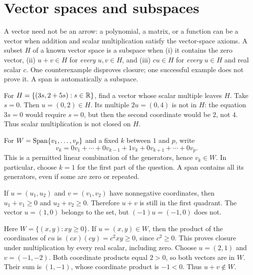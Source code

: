 \section{Vector spaces and subspaces}
A vector need not be an arrow: a polynomial, a matrix, or a function can be a
vector when addition and scalar multiplication satisfy the vector-space axioms.
A subset $H$ of a known vector space is a subspace when (i) it contains the zero
vector, (ii) $u+v\in H$ for \emph{every} $u,v\in H$, and (iii) $cu\in H$ for
\emph{every} $u\in H$ and real scalar $c$. One counterexample disproves closure;
one successful example does not prove it. A span is automatically a subspace.

\goal For $H=\{(3s,2+5s):s\in\mathbb{R}\}$, find a vector whose scalar multiple leaves $H$.
Take $s=0$. Then $u=(0,2)\in H$. Its multiple $2u=(0,4)$ is not in $H$:
the equation $3s=0$ would require $s=0$, but then the second coordinate would
be $2$, not $4$. Thus scalar multiplication is not closed on $H$.

For $W=\operatorname{Span}\{v_1,\ldots,v_p\}$ and a fixed $k$ between $1$ and $p$, write
\[
 v_k=0v_1+\cdots+0v_{k-1}+1v_k+0v_{k+1}+\cdots+0v_p.
\]
This is a permitted linear combination of the generators, hence $v_k\in W$.
In particular, choose $k=1$ for the first part of the question. A span contains
all its generators, even if some are zero or repeated.

If $u=(u_1,u_2)$ and $v=(v_1,v_2)$ have nonnegative coordinates, then
$u_1+v_1\ge0$ and $u_2+v_2\ge0$. Therefore $u+v$ is still in the first quadrant.
The vector $u=(1,0)$ belongs to the set, but $(-1)u=(-1,0)$ does not.

Here $W=\{(x,y):xy\ge0\}$. If $u=(x,y)\in W$, then the product of the
coordinates of $cu$ is $(cx)(cy)=c^2xy\ge0$, since $c^2\ge0$.
This proves closure under multiplication by every real scalar, including zero.
Choose $u=(2,1)$ and $v=(-1,-2)$. Both coordinate products equal $2>0$,
so both vectors are in $W$. Their sum is $(1,-1)$, whose coordinate product
is $-1<0$. Thus $u+v\notin W$.

